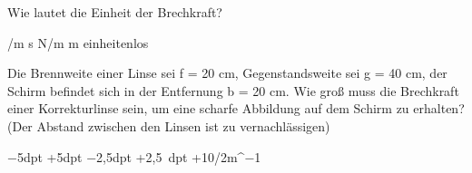 \documentclass[11pt]{exam}
\begin{document}
\begin{questions}
\vspace{3mm}\question Wie lautet die Einheit der Brechkraft?

\begin{choices}
	/m
	\choice s
	\choice N/m
	\choice m
	\choice einheitenlos
\end{choices}

\vspace{3mm}\question Die Brennweite einer Linse sei f = 20 cm, Gegenstandsweite sei g = 40 cm, der Schirm befindet sich in der Entfernung b = 20 cm. Wie groß muss die Brechkraft einer Korrekturlinse sein, um eine scharfe Abbildung auf dem Schirm zu erhalten? (Der Abstand zwischen den Linsen ist zu vernachlässigen)

\begin{choices}
	\choice −5dpt
	\choice +5dpt
	\choice −2,5dpt
	\choice +2,5 dpt
	\choice +10/2m^−1
\end{choices}

\vspace{3mm}\end{questions}
\end{document}
